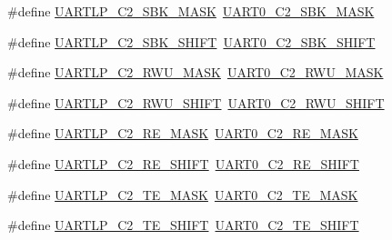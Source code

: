 \begin{DoxyCompactItemize}
\item 
\#define \hyperlink{group___backward___compatibility___symbols_ga6eae1bd3ccd0ddc022e4b25e685cdcd5}{U\+A\+R\+T\+L\+P\+\_\+\+C2\+\_\+\+S\+B\+K\+\_\+\+M\+A\+SK}~\hyperlink{group___u_a_r_t0___register___masks_ga13e4f48ae7752289f4d05530569f86a2}{U\+A\+R\+T0\+\_\+\+C2\+\_\+\+S\+B\+K\+\_\+\+M\+A\+SK}
\item 
\#define \hyperlink{group___backward___compatibility___symbols_ga7753cf443cbaa9e904cbd69211913709}{U\+A\+R\+T\+L\+P\+\_\+\+C2\+\_\+\+S\+B\+K\+\_\+\+S\+H\+I\+FT}~\hyperlink{group___u_a_r_t0___register___masks_gaa10ba8ef529e39693f0e8101fdec07fc}{U\+A\+R\+T0\+\_\+\+C2\+\_\+\+S\+B\+K\+\_\+\+S\+H\+I\+FT}
\item 
\#define \hyperlink{group___backward___compatibility___symbols_ga23425daa820ed95ebe0509a11b31712a}{U\+A\+R\+T\+L\+P\+\_\+\+C2\+\_\+\+R\+W\+U\+\_\+\+M\+A\+SK}~\hyperlink{group___u_a_r_t0___register___masks_gae7b3477741c9fb0783930456da17ac03}{U\+A\+R\+T0\+\_\+\+C2\+\_\+\+R\+W\+U\+\_\+\+M\+A\+SK}
\item 
\#define \hyperlink{group___backward___compatibility___symbols_ga7e3babc97f1d54f154097c1c3c7f9c13}{U\+A\+R\+T\+L\+P\+\_\+\+C2\+\_\+\+R\+W\+U\+\_\+\+S\+H\+I\+FT}~\hyperlink{group___u_a_r_t0___register___masks_ga2b35477c4d08786d549ff1908f1571e7}{U\+A\+R\+T0\+\_\+\+C2\+\_\+\+R\+W\+U\+\_\+\+S\+H\+I\+FT}
\item 
\#define \hyperlink{group___backward___compatibility___symbols_ga2e5e77f4d10c7c781b36e3d7083daa97}{U\+A\+R\+T\+L\+P\+\_\+\+C2\+\_\+\+R\+E\+\_\+\+M\+A\+SK}~\hyperlink{group___u_a_r_t0___register___masks_gac49427a605bbd952edc2790821b19161}{U\+A\+R\+T0\+\_\+\+C2\+\_\+\+R\+E\+\_\+\+M\+A\+SK}
\item 
\#define \hyperlink{group___backward___compatibility___symbols_ga7d8e4d4ef51751e7d193373f71e86458}{U\+A\+R\+T\+L\+P\+\_\+\+C2\+\_\+\+R\+E\+\_\+\+S\+H\+I\+FT}~\hyperlink{group___u_a_r_t0___register___masks_ga9b0dc4fdd0de7040c2aa8746f9b0465e}{U\+A\+R\+T0\+\_\+\+C2\+\_\+\+R\+E\+\_\+\+S\+H\+I\+FT}
\item 
\#define \hyperlink{group___backward___compatibility___symbols_ga418096fb8e70f64bd1f159cc2e05ce37}{U\+A\+R\+T\+L\+P\+\_\+\+C2\+\_\+\+T\+E\+\_\+\+M\+A\+SK}~\hyperlink{group___u_a_r_t0___register___masks_ga78c914234e9656aaa12582b408a31e64}{U\+A\+R\+T0\+\_\+\+C2\+\_\+\+T\+E\+\_\+\+M\+A\+SK}
\item 
\#define \hyperlink{group___backward___compatibility___symbols_gab5644d9346e8b389fe0c4b750f16e01e}{U\+A\+R\+T\+L\+P\+\_\+\+C2\+\_\+\+T\+E\+\_\+\+S\+H\+I\+FT}~\hyperlink{group___u_a_r_t0___register___masks_gadde2643c4aa03640ab1cf95ba8e07176}{U\+A\+R\+T0\+\_\+\+C2\+\_\+\+T\+E\+\_\+\+S\+H\+I\+FT}

\end{DoxyCompactItemize}
